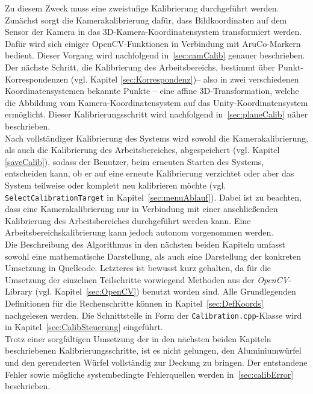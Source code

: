 Zu diesem Zweck muss eine zweistufige Kalibrierung durchgeführt werden. Zunächst sorgt die Kamerakalibrierung dafür, dass Bildkoordinaten auf dem Sensor der Kamera in das 3D-Kamera-Koordinatensystem transformiert werden. Dafür wird sich einiger OpenCV-Funktionen in Verbindung mit AruCo-Markern bedient. Dieser Vorgang wird nachfolgend in~\ref{sec:camCalib} genauer beschrieben.\\
Der nächste Schritt, die Kalibrierung des Arbeitsbereichs, bestimmt über Punkt-Korrespondenzen (vgl. Kapitel \ref{sec:Korrespondenz})-- also in zwei verschiedenen Koordinatensystemen bekannte Punkte -- eine affine 3D-Transformation, welche die Abbildung vom Kamera-Koordinaten\-system auf das Unity-Koordinatensystem ermöglicht. Dieser Kalibrierungsschritt wird nachfolgend in~\ref{sec:planeCalib} näher beschrieben.\\
Nach vollständiger Kalibrierung des Systems wird sowohl die Kamerakalibrierung, als auch die Kalibrierung des Arbeitsbereiches, abgespeichert (vgl. Kapitel \ref{saveCalib}), sodass der Benutzer, beim erneuten Starten des Systems, entscheiden kann, ob er auf eine erneute Kalibrierung verzichtet oder aber das System teilweise oder komplett neu kalibrieren möchte (vgl. \texttt{SelectCalibrationTarget} in Kapitel~\ref{sec:menuAblauf}). Dabei ist zu beachten, dass eine Kamerakalibrierung nur in Verbindung mit einer anschließenden Kalibrierung des Arbeitsbereiches durchgeführt werden kann. Eine Arbeitsbereichskalibrierung kann jedoch autonom vorgenommen werden. \\
Die Beschreibung des Algorithmus in den nächsten beiden Kapiteln umfasst sowohl eine mathematische Darstellung, als auch eine Darstellung der konkreten Umsetzung in Quellcode. Letzteres ist bewusst kurz gehalten, da für die Umsetzung der einzelnen Teilschritte vorwiegend Methoden aus der \textit{OpenCV}-Library (vgl. Kapitel~\ref{sec:OpenCV}) benutzt worden sind. Alle Grundlegenden Definitionen für die Rechenschritte können in Kapitel~\ref{sec:DefKoords} nachgelesen werden. Die Schnittstelle in Form der \texttt{Calibration.cpp}-Klasse wird in Kapitel~\ref{sec:CalibSteuerung} eingeführt.\\
Trotz einer sorgfältigen Umsetzung der in den nächsten beiden Kapiteln beschriebenen Kalibrierungsschritte, ist es nicht gelungen, den Aluminiumwürfel und den gerenderten Würfel vollständig zur Deckung zu bringen. Der entstandene Fehler sowie mögliche systembedingte Fehlerquellen werden in~\ref{sec:calibError} beschrieben. 

